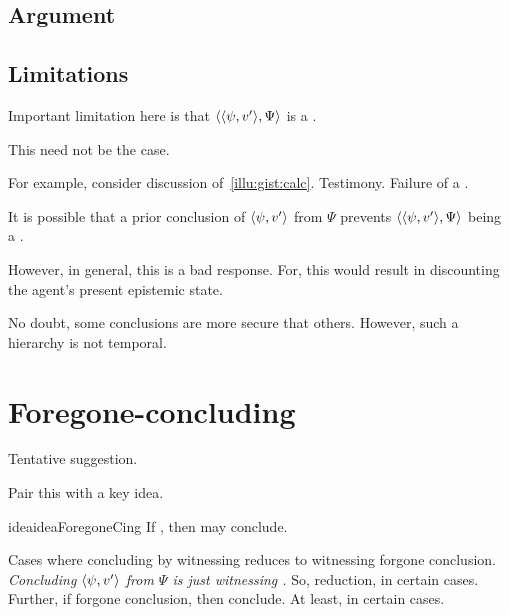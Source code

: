 \subsection{Argument}
\label{sec:argument}

\subsection{Limitations}

\begin{note}
  Important limitation here is that \(\langle \langle \psi, v' \rangle, \Psi \rangle\) is a \requ{}.

  This need not be the case.

  For example, consider discussion of~\autoref{illu:gist:calc}.
  Testimony.
  Failure of a \requ{}.

  It is possible that a prior conclusion of \(\langle \psi, v' \rangle\) from \(\Psi\) prevents \(\langle \langle \psi, v' \rangle, \Psi \rangle\) being a \requ{}.

  However, in general, this is a bad response.
  For, this would result in discounting the agent's present epistemic state.

  No doubt, some conclusions are more secure that others.
  However, such a hierarchy is not temporal.
\end{note}

\section{Foregone-concluding}

\begin{note}
  Tentative suggestion.
\end{note}

\begin{note}
  Pair this with a key idea.

  \begin{restatable}{idea}{ideaForegoneCing}
    \label{idea:reassignment}
    If \fc{}, then may conclude.
  \end{restatable}

  Cases where concluding by witnessing reduces to witnessing forgone conclusion.
  \emph{Concluding \(\langle \psi, v' \rangle\) from \(\Psi\) is just witnessing \fc{}.}
  So, reduction, in certain cases.
  Further, if forgone conclusion, then conclude.
  At least, in certain cases.
\end{note}

